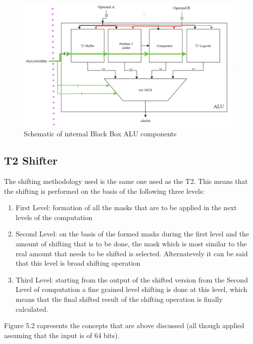 \begin{figure}[h!]
    \centering
    \includegraphics[scale = 0.55]
    {chapters/figures/ALUinternalUpdate}
    \caption{Schematic of internal Black Box ALU components }
    \label{fig:insideALU}
    \end{figure}

\newpage

\subsection{T2 Shifter}
 The shifting methodology used is the same one used as the T2. This means that the shifting is performed on the basis of the following three levels:

 \begin{enumerate}
    \item First Level: formation of all the masks that are to be applied in the next levels of the computation
    \item Second Level: on the basis of the formed masks during the first level and the amount of shifting that is to be done,
    the mask which is most similar to the real amount that needs to be shifted is selected. Alternatevely it can be said that this level is broad
    shifting operation
    \item Third Level: starting from the output of the shifted version from the Second Level of computation a fine grained level shifting is done at this level,
    which means that the final shifted result of the shifting operation is finally calculated.
    \end{enumerate}

    Figure 5.2 rapresents the concepts that are above discussed (all though applied assuming that the input is of 64 bits).

